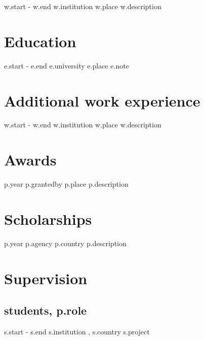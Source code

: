 \documentclass[10pt,letterpaper]{article} %
\begin{document}
{%
    { {{ w.start }} -   {{ w.end }} }
    { {{ w.institution }} }
    { {{ w.place }} }
    { {{ w.description }} }
{%



\section*{Education} %

{%
    { {{ e.start }} - {{ e.end }} }
    { {{ e.university }} }
    { {{ e.place}} }
    { {{ e.note }} }
{%
\vspace{10pt}

\section*{Additional work experience} %

{%
    { {{ w.start }} -   {{ w.end }} }
    { {{ w.institution }} }
    { {{ w.place }} }
    { {{ w.description }} }
{%

\section*{Awards}

{%
    { {{ p.year }} }
    { {{ p.grantedby }} }
    { {{p.place}} }
    { {{ p.description }} }
{%

\section*{Scholarships}

{%
    { {{ p.year }} }
    { {{ p.agency }} }
    { {{ p.country }} }
    { {{ p.description }} }
{%

\section*{Supervision}

{%
\subsection*{ students, {{ p.role }}  }
    {%
        { {{ s.start }} - {{s.end}} }
        {  }
        { {{ s.institution }}, {{ s.country }} }
        { { {{ s.project }} } }
        {%
{%


}}}}}}}}}}}}}}
\end{document}
